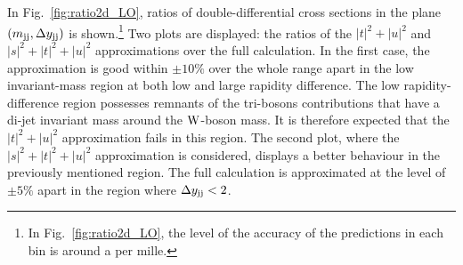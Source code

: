 In Fig.~\ref{fig:ratio2d_LO}, ratios of double-differential cross sections in the plane $\left(m_{\text{j}\text{j}}, \Delta y_{\text{j}\text{j}}\right)$ is shown.\footnote{In Fig.~\ref{fig:ratio2d_LO}, the level of the accuracy of the predictions in each bin is around a per mille.}
Two plots are displayed: the ratios of the $|t|^2 + |u|^2$ and $|s|^2 + |t|^2 + |u|^2$ approximations over the full calculation.
In the first case, the approximation is good within $\pm10\%$ over the whole range apart in the low invariant-mass region at both low and large rapidity difference.
The low rapidity-difference region possesses remnants of the tri-bosons contributions that have a di-jet invariant mass around the $\text{W}$-boson mass.
It is therefore expected that the $|t|^2 + |u|^2$ approximation fails in this region.
The second plot, where the $|s|^2 + |t|^2 + |u|^2$ approximation is considered, displays a better behaviour in the previously mentioned region.
The full calculation is approximated at the level of $\pm5\%$ apart in the region where $\Delta y_{\text{j}\text{j}} < 2$.

